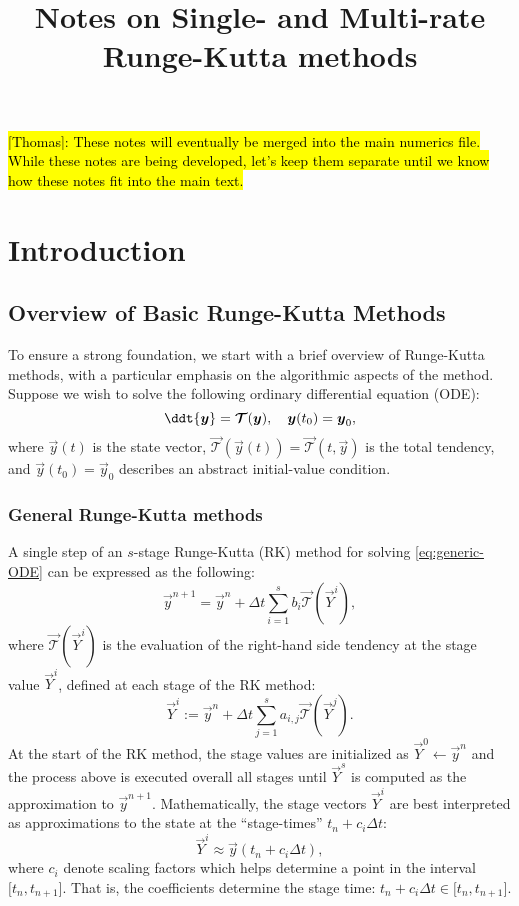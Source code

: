 \documentclass{article}
\title{Notes on Single- and Multi-rate Runge-Kutta methods}
\begin{document}
\maketitle
\tableofcontents

\hl{[Thomas]: These notes will eventually be merged into the main numerics file.
	While these notes are being developed, let's keep them separate until we know
	how these notes fit into the main text.}

\section{Introduction}

\subsection{Overview of Basic Runge-Kutta Methods} To ensure a strong foundation, we start
with a brief overview of Runge-Kutta methods, with a particular emphasis
on the algorithmic aspects of the method. Suppose we wish to solve the following
ordinary differential equation (ODE):
\begin{equation}\label{eq:generic-ODE}
	\ddt{\vec{y}} = \vec{\mathcal{T}}(\vec{y}), \quad \vec{y}(t_0) = \vec{y}_0,
\end{equation}
where $\vec{y}(t)$ is the state vector, $\vec{\mathcal{T}}(\vec{y}(t)) = \vec{\mathcal{T}}(t, \vec{y})$
is the total tendency, and $\vec{y}(t_0) = \vec{y}_0$ describes an abstract initial-value condition.

\subsubsection{General Runge-Kutta methods}
A single step of an $s$-stage Runge-Kutta (RK) method for
solving \eqref{eq:generic-ODE} can be expressed as the following:
\begin{equation}\label{eq:gen-rk}
	\vec{y}^{n+1} = \vec{y}^n + \Delta t \sum_{i=1}^{s} b_i \vec{\mathcal{T}}(\vec{Y}^i),
\end{equation}
where $\vec{\mathcal{T}}(\vec{Y}^i)$ is the evaluation of the right-hand side tendency at the stage value $\vec{Y}^i$,
defined at each stage of the RK method:
\begin{equation}\label{eq:gen-rk-stage-vals}
	\vec{Y}^i := \vec{y}^{n} + \Delta t \sum_{j=1}^{s} a_{i,j} \vec{\mathcal{T}}(\vec{Y}^j).
\end{equation}
At the start of the RK method, the stage values are initialized as $\vec{Y}^{0} \leftarrow \vec{y}^n$
and the process above is executed overall all stages until $\vec{Y}^s$ is computed as the approximation
to $\vec{y}^{n+1}$. Mathematically, the stage vectors $\vec{Y}^i$ are best interpreted as
approximations to the state at the ``stage-times'' $t_n + c_i\Delta t$:
\begin{equation}
	\vec{Y}^i \approx \vec{y}(t_n + c_i\Delta t),
\end{equation}
where $c_i$ denote scaling factors which helps determine a point in the interval $\lbrack t_n, t_{n+1}\rbrack$. That
is, the coefficients determine the stage time: $t_n + c_i\Delta t \in \lbrack t_n, t_{n+1}\rbrack$.
\end{document}
